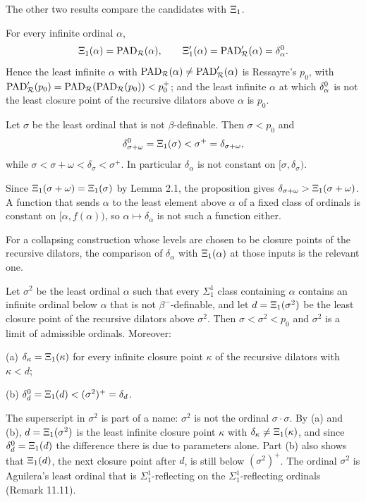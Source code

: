 \documentclass[11pt]{article}
\begin{document}
The other two results compare the candidates with $\Xi_1$.

\begin{statement} For every infinite ordinal $\alpha$,
\[ \Xi_1(\alpha) = \mathrm{PAD}_{\mathcal R}(\alpha), \qquad \Xi'_1(\alpha) = \mathrm{PAD}'_{\mathcal R}(\alpha) = \delta^0_{\alpha} . \]
Hence the least infinite $\alpha$ with $\mathrm{PAD}_{\mathcal R}(\alpha) \ne \mathrm{PAD}'_{\mathcal R}(\alpha)$ is Ressayre's $p_0$, with
$\mathrm{PAD}'_{\mathcal R}(p_0) = \mathrm{PAD}_{\mathcal R}(\mathrm{PAD}_{\mathcal R}(p_0)) < p_0^+$; and the least infinite $\alpha$ at which
$\delta^0_{\alpha}$ is not the least closure point of the recursive dilators above $\alpha$ is $p_0$.
\end{statement}

\begin{statement} Let $\sigma$ be the least ordinal that is not $\beta$-definable. Then
$\sigma < p_0$ and
\[ \delta^0_{\sigma + \omega} = \Xi_1(\sigma) < \sigma^+ = \delta_{\sigma + \omega} , \]
while $\sigma < \sigma + \omega < \delta_{\sigma} < \sigma^+$. In particular $\delta_{\alpha}$ is not constant on
$[\sigma, \delta_{\sigma})$.
\end{statement}

Since $\Xi_1(\sigma + \omega) = \Xi_1(\sigma)$ by Lemma 2.1, the proposition gives
$\delta_{\sigma + \omega} > \Xi_1(\sigma + \omega)$. A function that sends $\alpha$ to the least element above
$\alpha$ of a fixed class of ordinals is constant on $[\alpha, f(\alpha))$, so $\alpha \mapsto \delta_{\alpha}$ is
not such a function either.

For a collapsing construction whose levels are chosen to be closure points of the recursive dilators, the
comparison of $\delta_{\alpha}$ with $\Xi_1(\alpha)$ at those inputs is the relevant one.

\begin{statement} Let $\sigma^2$ be the least ordinal $\alpha$ such that every $\Sigma^1_1$ class
containing $\alpha$ contains an infinite ordinal below $\alpha$ that is not $\beta^-$-definable, and let
$d = \Xi_1(\sigma^2)$ be the least closure point of the recursive dilators above $\sigma^2$. Then
$\sigma < \sigma^2 < p_0$ and $\sigma^2$ is a limit of admissible ordinals. Moreover:

(a) $\delta_{\kappa} = \Xi_1(\kappa)$ for every infinite closure point $\kappa$ of the recursive dilators with
$\kappa < d$;

(b) $\delta^0_{d} = \Xi_1(d) < (\sigma^2)^+ = \delta_d$.
\end{statement}

The superscript in $\sigma^2$ is part of a name: $\sigma^2$ is not the ordinal $\sigma \cdot \sigma$. By (a) and
(b), $d = \Xi_1(\sigma^2)$ is the least infinite closure point $\kappa$ with $\delta_{\kappa} \ne \Xi_1(\kappa)$, and
since $\delta^0_{d} = \Xi_1(d)$ the difference there is due to parameters alone. Part (b) also shows that $\Xi_1(d)$, the
next closure point after $d$, is still below $(\sigma^2)^+$. The ordinal $\sigma^2$ is Aguilera's least ordinal
that is $\Sigma^1_1$-reflecting on the $\Sigma^1_1$-reflecting ordinals (Remark 11.11).
\end{document}
